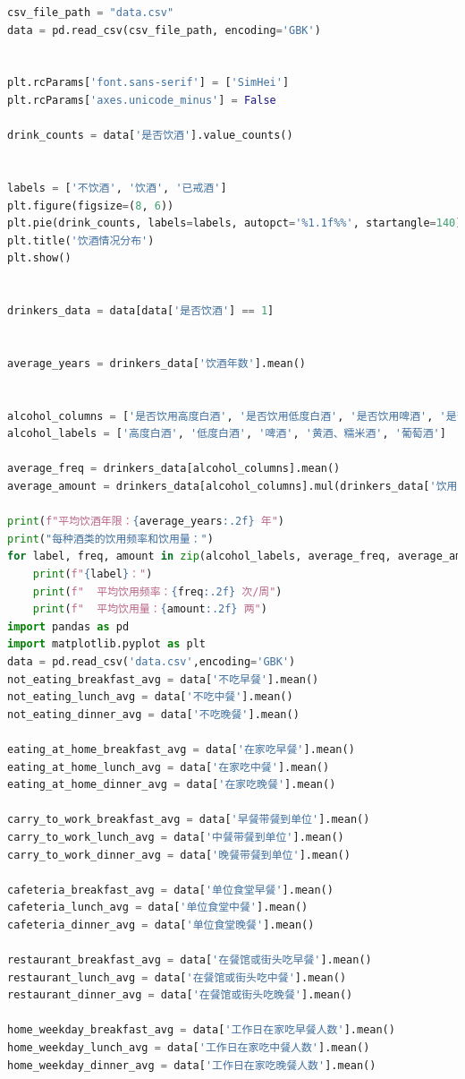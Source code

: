 \documentclass{cumcmthesis}
\begin{document}
\begin{appendices}
\begin{lstlisting}[language=python]
csv_file_path = "data.csv"  
data = pd.read_csv(csv_file_path, encoding='GBK')


plt.rcParams['font.sans-serif'] = ['SimHei']
plt.rcParams['axes.unicode_minus'] = False 

drink_counts = data['是否饮酒'].value_counts()


labels = ['不饮酒', '饮酒', '已戒酒']
plt.figure(figsize=(8, 6))
plt.pie(drink_counts, labels=labels, autopct='%1.1f%%', startangle=140)
plt.title('饮酒情况分布')
plt.show()


drinkers_data = data[data['是否饮酒'] == 1]


average_years = drinkers_data['饮酒年数'].mean()


alcohol_columns = ['是否饮用高度白酒', '是否饮用低度白酒', '是否饮用啤酒', '是否饮用黄酒、糯米酒', '是否饮用葡萄酒']
alcohol_labels = ['高度白酒', '低度白酒', '啤酒', '黄酒、糯米酒', '葡萄酒']

average_freq = drinkers_data[alcohol_columns].mean()
average_amount = drinkers_data[alcohol_columns].mul(drinkers_data['饮用频率'], axis=0).sum() / drinkers_data['饮用频率'].sum()

print(f"平均饮酒年限：{average_years:.2f} 年")
print("每种酒类的饮用频率和饮用量：")
for label, freq, amount in zip(alcohol_labels, average_freq, average_amount):
    print(f"{label}：")
    print(f"  平均饮用频率：{freq:.2f} 次/周")
    print(f"  平均饮用量：{amount:.2f} 两")
import pandas as pd
import matplotlib.pyplot as plt
data = pd.read_csv('data.csv',encoding='GBK')
not_eating_breakfast_avg = data['不吃早餐'].mean()
not_eating_lunch_avg = data['不吃中餐'].mean()
not_eating_dinner_avg = data['不吃晚餐'].mean()

eating_at_home_breakfast_avg = data['在家吃早餐'].mean()
eating_at_home_lunch_avg = data['在家吃中餐'].mean()
eating_at_home_dinner_avg = data['在家吃晚餐'].mean()

carry_to_work_breakfast_avg = data['早餐带餐到单位'].mean()
carry_to_work_lunch_avg = data['中餐带餐到单位'].mean()
carry_to_work_dinner_avg = data['晚餐带餐到单位'].mean()

cafeteria_breakfast_avg = data['单位食堂早餐'].mean()
cafeteria_lunch_avg = data['单位食堂中餐'].mean()
cafeteria_dinner_avg = data['单位食堂晚餐'].mean()

restaurant_breakfast_avg = data['在餐馆或街头吃早餐'].mean()
restaurant_lunch_avg = data['在餐馆或街头吃中餐'].mean()
restaurant_dinner_avg = data['在餐馆或街头吃晚餐'].mean()

home_weekday_breakfast_avg = data['工作日在家吃早餐人数'].mean()
home_weekday_lunch_avg = data['工作日在家吃中餐人数'].mean()
home_weekday_dinner_avg = data['工作日在家吃晚餐人数'].mean()


\end{lstlisting}
\end{appendices}
\end{document}

